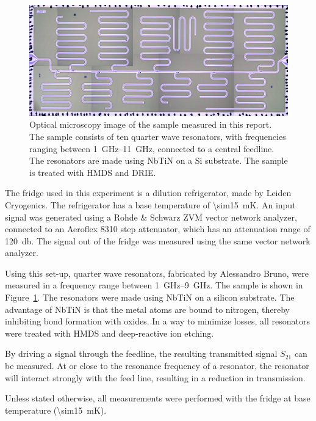   \begin{figure}
      \begin{center}
          \includegraphics[width=\textwidth]{Figures/DRIE/All_set4.png}
      \end{center}
      \caption{Optical microscopy image of the sample measured in this report. The sample consists of ten quarter wave resonators, with frequencies ranging between \SIrange{1}{11}{\giga \hertz}, connected to a central feedline. The resonators are made using NbTiN on a Si substrate. The sample is treated with HMDS and DRIE.}
      \label{fig:set4}
  \end{figure}

  The fridge used in this experiment is a dilution refrigerator, made by Leiden Cryogenics. The refrigerator has a base temperature of \SI{\sim15}{\milli \kelvin}. An input signal was generated using a Rohde \& Schwarz ZVM vector network analyzer, connected to an Aeroflex 8310 step attenuator, which has an attenuation range of \SI{120}{\decibel}. The signal out of the fridge was measured using the same vector network analyzer.

  Using this set-up, quarter wave resonators, fabricated by Alessandro Bruno, were measured in a frequency range between \SIrange{1}{9}{\giga \hertz}. The sample is shown in Figure~\ref{fig:set4}. The resonators were made using NbTiN on a silicon substrate. The advantage of NbTiN is that the metal atoms are bound to nitrogen, thereby inhibiting bond formation with oxides. In a way to minimize losses, all resonators were treated with HMDS and deep-reactive ion etching.

  By driving a signal through the feedline, the resulting transmitted signal $S_{21}$ can be measured. At or close to the resonance frequency of a resonator, the resonator will interact strongly with the feed line, resulting in a reduction in transmission.

  Unless stated otherwise, all measurements were performed with the fridge at base temperature (\SI{\sim15}{\milli \kelvin}).


